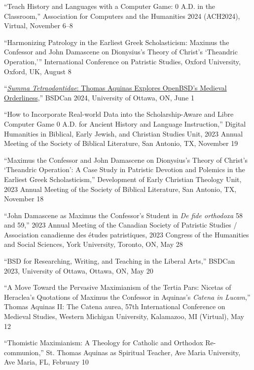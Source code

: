 \documentclass[letterpaper,12pt]{article}
\newcommand{\years}[1]{%
  {\reversemarginpar\strut\marginnote{{\small#1}}}%
}
\begin{document}
{{{{{{{{\years{2024}%
%
``Teach History and Languages with a Computer Game: 0 A.D. in the Classroom,'' Association for Computers and the Humanities 2024 (ACH2024), Virtual, November 6--8 \\ [.3cm]
\years{2024}%
%
``Harmonizing Patrology in the Earliest Greek Scholasticism: Maximus the Confessor and John Damascene on Dionysius's Theory of Christ's `Theandric Operation,''' International Conference on Patristic Studies, Oxford University, Oxford, UK, August 8 \\ [.3cm]
\years{2024}%
%
``\href{https://www.youtube.com/watch?v=9uTBkdQpxZo}{\emph{Summa Tetraodontidae}: Thomas Aquinas Explores OpenBSD's Medieval Orderliness},'' BSDCan 2024, University of Ottawa, ON, June 1 \\ [.3cm]
%
\years{2023}%
%
``How to Incorporate Real-world Data into the Scholarship-Aware and Libre Computer Game 0 A.D. for Ancient History and Language Instruction,'' Digital Humanities in Biblical, Early Jewish, and Christian Studies Unit, 2023 Annual Meeting of the Society of Biblical Literature, San Antonio, TX, November 19  \\ [.3cm]
%
\years{2023}%
%
``Maximus the Confessor and John Damascene on Dionysius's Theory of Christ's `Theandric Operation': A Case Study in Patristic Devotion and Polemics in the Earliest Greek Scholasticism,'' Development of Early Christian Theology Unit, 2023 Annual Meeting of the Society of Biblical Literature, San Antonio, TX, November 18  \\ [.3cm]
%
\years{2023}%
%
``John Damascene as Maximus the Confessor's Student in \emph{De fide orthodoxa} 58 and 59,'' 2023 Annual Meeting of the Canadian Society of Patristic Studies / Association canadienne des études patristiques, 2023 Congress of the Humanities and Social Sciences, York University, Toronto, ON, May 28  \\ [.3cm]
%
\years{2023}%
%
``BSD for Researching, Writing, and Teaching in the Liberal Arts,'' BSDCan 2023, University of Ottawa, Ottawa, ON, May 20  \\ [.3cm]
%
\years{2022}%
%
``A Move Toward the Pervasive Maximianism of the Tertia Pars: Nicetas of Heraclea's Quotations of Maximus the Confessor in Aquinas's \emph{Catena in Lucam},'' Thomas Aquinas II: The Catena aurea, 57th International Conference on Medieval Studies, Western Michigan University, Kalamazoo, MI (Virtual), May 12 \\ [.3cm]
%
\years{2022}%
%
``Thomistic Maximianism: A Theology for Catholic and Orthodox Re-communion,'' St. Thomas Aquinas as Spiritual Teacher, Ave Maria University, Ave Maria, FL, February 10 \\ [.3cm]
}}}}}}}}
\end{document}

